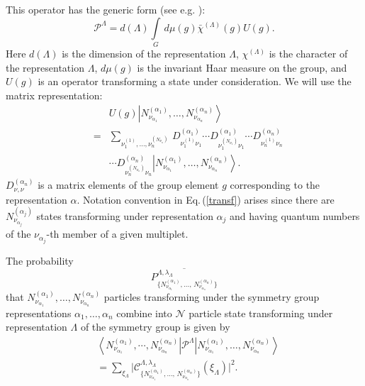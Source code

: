 \documentclass[a4paper]{article}
\begin{document}
This operator has the generic form (see e.g. \cite{Wigner}):
\begin{equation}\label{proj1}
{\mathcal
P}^{\Lambda}=d(\Lambda)\int\limits_G\,d\mu(g)\bar\chi^{(\Lambda)}(g)U(g).
\end{equation}
Here $d(\Lambda)$ is the dimension of the representation
$\Lambda$, $\chi^{(\Lambda)}$ is the character of the
representation $\Lambda$, $d\mu(g)$ is the invariant Haar measure
on the group, and $U(g)$ is an operator transforming a state under
consideration. We will use the matrix representation:
\begin{eqnarray}
&&U(g)\left\vert N^{(\alpha_1)}_{\nu_{\alpha_1}},\dots,
N^{(\alpha_n)}_{\nu_{\alpha_n}}\right\rangle\nonumber\\[4pt] &=&
\sum\limits_{\nu_1^{(1)},\dots,\nu_n^{(N_{\nu_n})}}\,
D^{(\alpha_1)}_{\nu_1^{(1)}\nu_1}\!\!\cdots
D^{(\alpha_1)}_{\nu_1^{(N_{\nu_1})}\nu_1}\!\!\cdots
D^{(\alpha_n)}_{\nu_n^{(1)}\nu_n}\nonumber\\[4pt]
&&\cdots D^{(\alpha_n)}_{\nu_n^{(N_{\nu_n})}\nu_n} \left\vert
N^{(\alpha_1)}_{\nu_{\alpha_1}},\dots,
N^{(\alpha_n)}_{\nu_{\alpha_n}}\right\rangle .
 \label{transf}
\end{eqnarray}
$D^{(\alpha_n)}_{\nu,\nu}$ is a matrix elements of the group
element $g$ corresponding to the representation $\alpha$. Notation
convention in Eq.\,(\ref{transf}) arises since  there are
$N^{(\alpha_j)}_{\nu_{\alpha_j}}$ states transforming under
representation $\alpha_j$ and having quantum numbers of the
$\nu_{\alpha_j}$-th member of a given multiplet.

The probability
\[\overline{P^{\Lambda,\lambda_{\Lambda}}_{\{N^{(\alpha_1)}_{\nu_{\alpha_1}},
\dots,\,N^{(\alpha_n)}_{\nu_{\alpha_n}}\}}}\] that
$N^{(\alpha_1)}_{\nu_{\alpha_1}},\dots, N^{(\alpha_n)}_{
\nu_{\alpha_n}}$ particles transforming under the symmetry group
representations $\alpha_1,\dots,\alpha_n$ combine into $\mathcal
N$ particle state transforming under representation $\Lambda$ of
the symmetry group is given by
\begin{eqnarray}
&\left\langle N^{(\alpha_1)}_{\nu_{\alpha_1}},
\cdots,N^{(\alpha_n)}_{\nu_{\alpha_n}}\right\vert {\mathcal P
}^{\Lambda}\left\vert N^{(\alpha_1)}_{\nu_{\alpha_1}},\dots,
N^{(\alpha_n)}_{\nu_{\alpha_n}}\right\rangle\nonumber\\[4pt] &=
\sum\limits_{\xi_\Lambda}\vert{\mathcal
C}^{\Lambda,\lambda_{\Lambda}}_{\{N^{(\alpha_1)}_{\nu_{\alpha_1}},
\dots,\,N^{(\alpha_n)}_{\nu_{\alpha_n}}\}}(\xi_\Lambda)\vert^2 .
\label{normP}
\end{eqnarray}
\end{document}
